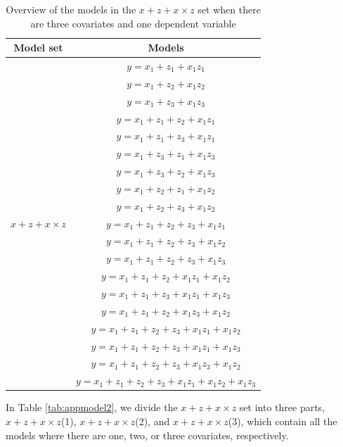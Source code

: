 \begin{table}[hbt!]
\caption{}
\caption*{Overview of the models in the $x + z + x \times z$ set when there are three covariates and one dependent variable}
\label{tab:appmodel1}
\centering
\begin{tabular}{cc}
\toprule
Model set & Models \\ 
\midrule
\multirow{19}{*}{$x + z + x \times z$} & $y=x_1+z_1+x_1z_1$\\ &  $y=x_1+z_2+x_1z_2$\\ &  $y=x_1+z_3+x_1z_3$\\ & $y=x_1+z_1+z_2+x_1z_1$\\ & $y=x_1+z_1+z_3+x_1z_1$\\ & $y=x_1+z_3+z_1+x_1z_3$\\ & $y=x_1+z_3+z_2+x_1z_3$\\ & $y=x_1+z_2+z_1+x_1z_2$\\ & $y=x_1+z_2+z_3+x_1z_2$\\ & $y=x_1+z_1+z_2+z_3+x_1z_1$\\ & $y=x_1+z_1+z_2+z_3+x_1z_2$\\ & $y=x_1+z_1+z_2+z_3+x_1z_3$\\ & $y=x_1+z_1+z_2+x_1z_1+x_1z_2$\\ & $y=x_1+z_1+z_3+x_1z_1+x_1z_3$\\ & $y=x_1+z_1+z_2+x_1z_3+x_1z_2$\\ & $y=x_1+z_1+z_2+z_3+x_1z_1+x_1z_2$\\ & $y=x_1+z_1+z_2+z_3+x_1z_1+x_1z_3$\\ & $y=x_1+z_1+z_2+z_3+x_1z_3+x_1z_2$\\ & $y=x_1+z_1+z_2+z_3+x_1z_1+x_1z_2+x_1z_3$\\  
\bottomrule
\end{tabular}
\end{table}

In Table \ref{tab:appmodel2}, we divide the $x + z + x \times z$ set into three parts, $x + z + x \times z$(1), $x + z + x \times z$(2), and $x + z + x \times z$(3), which contain all the models where there are one, two, or three covariates, respectively. \\

